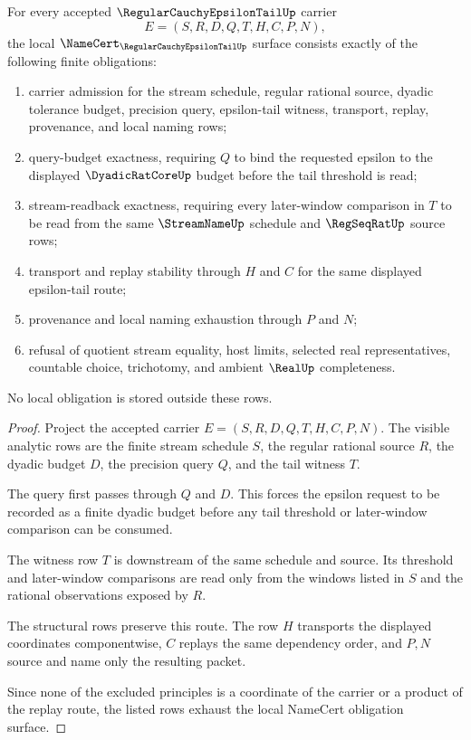 \begin{theorem}
\label{thm:regular-cauchy-epsilon-tail-namecert-obligations}
For every accepted $\RegularCauchyEpsilonTailUp$ carrier
$$
E=(S,R,D,Q,T,H,C,P,N),
$$
the local $\NameCert_{\RegularCauchyEpsilonTailUp}$ surface consists exactly of the following finite obligations:
\begin{enumerate}
\item carrier admission for the stream schedule, regular rational source, dyadic tolerance budget, precision query, epsilon-tail witness, transport, replay, provenance, and local naming rows;
\item query-budget exactness, requiring $Q$ to bind the requested epsilon to the displayed $\DyadicRatCoreUp$ budget before the tail threshold is read;
\item stream-readback exactness, requiring every later-window comparison in $T$ to be read from the same $\StreamNameUp$ schedule and $\RegSeqRatUp$ source rows;
\item transport and replay stability through $H$ and $C$ for the same displayed epsilon-tail route;
\item provenance and local naming exhaustion through $P$ and $N$;
\item refusal of quotient stream equality, host limits, selected real representatives, countable choice, trichotomy, and ambient $\RealUp$ completeness.
\end{enumerate}
No local obligation is stored outside these rows.
\end{theorem}
\begin{proof}
Project the accepted carrier $E=(S,R,D,Q,T,H,C,P,N)$. The visible analytic rows are the finite stream schedule $S$, the regular rational source $R$, the dyadic budget $D$, the precision query $Q$, and the tail witness $T$.

The query first passes through $Q$ and $D$. This forces the epsilon request to be recorded as a finite dyadic budget before any tail threshold or later-window comparison can be consumed.

The witness row $T$ is downstream of the same schedule and source. Its threshold and later-window comparisons are read only from the windows listed in $S$ and the rational observations exposed by $R$.

The structural rows preserve this route. The row $H$ transports the displayed coordinates componentwise, $C$ replays the same dependency order, and $P,N$ source and name only the resulting packet.

Since none of the excluded principles is a coordinate of the carrier or a product of the replay route, the listed rows exhaust the local NameCert obligation surface.
\end{proof}

